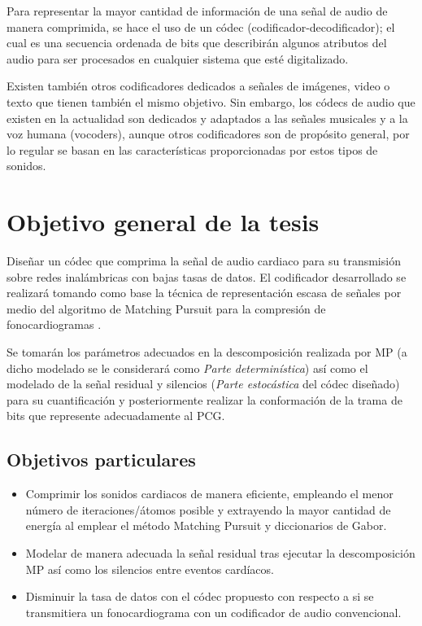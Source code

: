  Para representar la mayor cantidad de información de una señal de audio de manera comprimida, se hace el uso de un códec (codificador-decodificador); el cual es una secuencia ordenada de bits que describirán algunos atributos del audio para ser procesados en cualquier sistema que esté digitalizado. 

Existen también otros codificadores dedicados a señales de imágenes, video o texto que tienen también el mismo objetivo. Sin embargo, los códecs de audio que existen en la actualidad son dedicados y adaptados a las señales musicales y a la voz humana (vocoders), aunque otros codificadores son de propósito general, por lo regular se basan en las características proporcionadas por estos tipos de sonidos.


\section{Objetivo general de la tesis}
Diseñar un códec que comprima la señal de audio cardiaco para su transmisión sobre redes inalámbricas con bajas tasas de datos. 
El codificador desarrollado se realizará tomando como base la técnica de representación escasa de señales por medio del algoritmo de Matching Pursuit para la compresión de fonocardiogramas \cite[]{Nieblas2014}.  

Se tomarán los parámetros adecuados en la descomposición realizada por MP (a dicho modelado se le considerará como \emph{Parte determinística}) así como el modelado de la señal residual y silencios (\emph{Parte estocástica} del códec diseñado) para su cuantificación y posteriormente realizar la conformación de la trama de bits que represente adecuadamente al PCG. 
\subsection{Objetivos particulares} 
\begin{itemize}
	\item Comprimir los sonidos cardiacos de manera eficiente, empleando el menor número de iteraciones/átomos posible y 		extrayendo la mayor cantidad de energía al emplear el método Matching Pursuit y diccionarios de Gabor.
	\item Modelar de manera adecuada la señal residual tras ejecutar la descomposición MP así como los silencios entre 			eventos cardíacos.
	\item Disminuir la tasa de datos con el códec propuesto con respecto a si se transmitiera un fonocardiograma con un 		codificador de audio convencional. 
\end{itemize}

